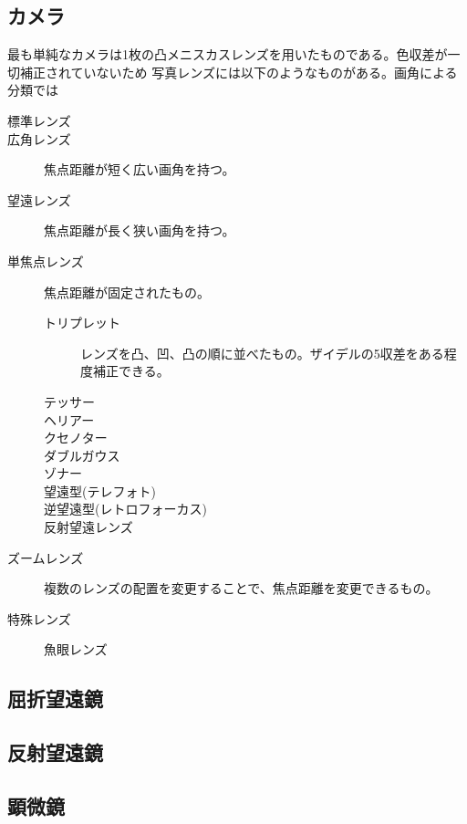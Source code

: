 \subsection{カメラ}
	最も単純なカメラは1枚の凸メニスカスレンズを用いたものである。色収差が一切補正されていないため
	写真レンズには以下のようなものがある。画角による分類では
	\begin{description}
		\item[標準レンズ] 
		\item[広角レンズ] 焦点距離が短く広い画角を持つ。
		\item[望遠レンズ] 焦点距離が長く狭い画角を持つ。
	\end{description}
	\begin{description}
		\item[単焦点レンズ] 焦点距離が固定されたもの。
		\begin{description}
			\item[トリプレット] レンズを凸、凹、凸の順に並べたもの。ザイデルの5収差をある程度補正できる。
			\item[テッサー] 
			\item[ヘリアー] 
			\item[クセノター] 
			\item[ダブルガウス] 
			\item[ゾナー] 
			\item[望遠型(テレフォト)] 
			\item[逆望遠型(レトロフォーカス)] 
			\item[反射望遠レンズ] 
		\end{description}
		\item[ズームレンズ] 複数のレンズの配置を変更することで、焦点距離を変更できるもの。
		\item[特殊レンズ]
		\begin{description}
			\item[魚眼レンズ]
		\end{description}
	\end{description}
	
\subsection{屈折望遠鏡}
\subsection{反射望遠鏡}
\subsection{顕微鏡}